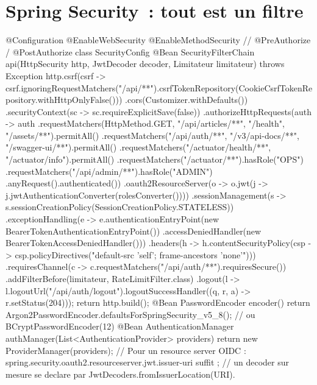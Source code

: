 \section{Spring Security~: tout est un filtre}

\begin{codejava}
@Configuration
@EnableWebSecurity
@EnableMethodSecurity                                    // @PreAuthorize / @PostAuthorize
class SecurityConfig {
    @Bean
    SecurityFilterChain api(HttpSecurity http, JwtDecoder decoder, Limitateur limitateur) throws Exception {
        http.csrf(csrf -> csrf.ignoringRequestMatchers("/api/**").csrfTokenRepository(CookieCsrfTokenRepository.withHttpOnlyFalse()))
            .cors(Customizer.withDefaults())
            .securityContext(sc -> sc.requireExplicitSave(false))
            .authorizeHttpRequests(auth -> auth
                .requestMatchers(HttpMethod.GET, "/api/articles/**", "/health", "/assets/**").permitAll()
                .requestMatchers("/api/auth/**", "/v3/api-docs/**", "/swagger-ui/**").permitAll()
                .requestMatchers("/actuator/health/**", "/actuator/info").permitAll()
                .requestMatchers("/actuator/**").hasRole("OPS")
                .requestMatchers("/api/admin/**").hasRole("ADMIN")
                .anyRequest().authenticated())
            .oauth2ResourceServer(o -> o.jwt(j -> j.jwtAuthenticationConverter(rolesConverter())))
            .sessionManagement(s -> s.sessionCreationPolicy(SessionCreationPolicy.STATELESS))
            .exceptionHandling(e -> e.authenticationEntryPoint(new BearerTokenAuthenticationEntryPoint())
                                    .accessDeniedHandler(new BearerTokenAccessDeniedHandler()))
            .headers(h -> h.contentSecurityPolicy(csp -> csp.policyDirectives("default-src 'self'; frame-ancestors 'none'")))
            .requiresChannel(c -> c.requestMatchers("/api/auth/**").requiresSecure())
            .addFilterBefore(limitateur, RateLimitFilter.class)
            .logout(l -> l.logoutUrl("/api/auth/logout").logoutSuccessHandler((q, r, a) -> r.setStatus(204)));
        return http.build();
    }
    @Bean PasswordEncoder encoder() {
        return Argon2PasswordEncoder.defaultsForSpringSecurity_v5_8();   // ou BCryptPasswordEncoder(12)
    }
    @Bean AuthenticationManager authManager(List<AuthenticationProvider> providers) { return new ProviderManager(providers); }
    // Pour un resource server OIDC : spring.security.oauth2.resourceserver.jwt.issuer-uri suffit ;
    // un decoder sur mesure se declare par JwtDecoders.fromIssuerLocation(URI).
}
\end{codejava}
